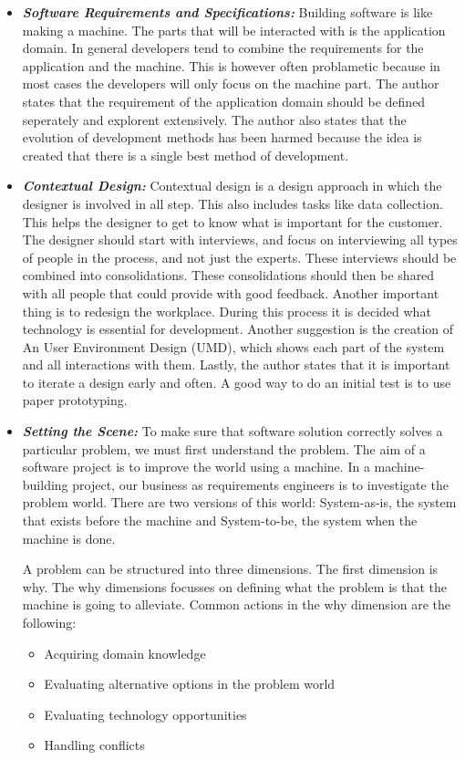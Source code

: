 \documentclass[]{article}
\begin{document}
\begin{itemize}
    \item[] \textbf{\textit{Software Requirements and Specifications: }}
    Building software is like making a machine. The parts that will be interacted 
    with is the application domain. In general developers tend to combine the 
    requirements for the application and the machine. This is however often 
    problametic because in most cases the developers will only focus on the machine part.
    The author states that the requirement of the application domain should be 
    defined seperately and explorent extensively. The author also states that 
    the evolution of development methods has been harmed because the idea is 
    created that there is a single best method of development. 

    \item[] \textbf{\textit{Contextual Design: }}
    Contextual design is a design approach in which the designer is involved in all step.
    This also includes tasks like data collection. This helps the designer to 
    get to know what is important for the customer. The designer should start with 
    interviews, and focus on interviewing all types of people in the process, and not just 
    the experts. These interviews should be combined into consolidations. These
    consolidations should then be shared with all people that could provide with 
    good feedback. Another important thing is to redesign the workplace. 
    During this process it is decided what technology is essential for development.
    Another suggestion is the creation of An User Environment Design (UMD), which 
    shows each part of the system and all interactions with them. Lastly, the 
    author states that it is important to iterate a design early and often. A
    good way to do an initial test is to use paper prototyping.

    \item[] \textbf{\textit{Setting the Scene: }}
    To make sure that software solution correctly solves a particular problem, 
    we must first understand the problem. 
    The aim of a software project is to improve the world using a machine. 
    In a machine-building project, our business as requirements engineers is to 
    investigate the problem world. There are two versions of this world: System-as-is, 
    the system that exists before the machine and System-to-be, 
    the system when the machine is done. 

    A problem can be structured into three dimensions. 
    The first dimension is why. The why dimensions focusses on defining what the problem is 
    that the machine is going to alleviate. Common actions in the why dimension 
    are the following:
    \begin{itemize}
        \item[] Acquiring domain knowledge 
        \item[] Evaluating alternative options in the problem world 
        \item[] Evaluating technology opportunities 
        \item[] Handling conflicts
    \end{itemize}


\end{itemize}
\end{document}
